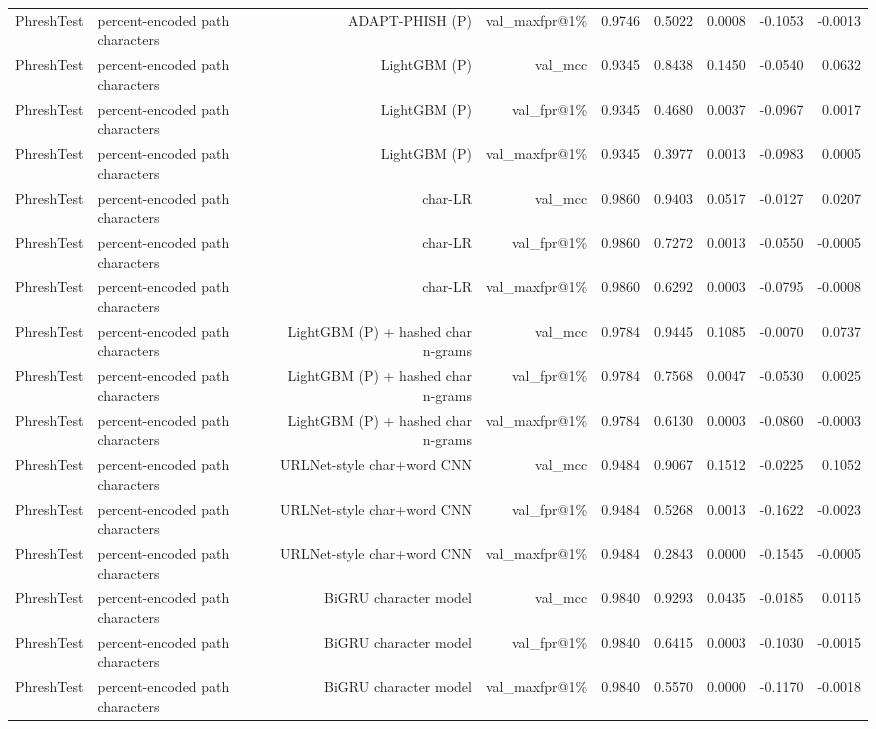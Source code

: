 \begin{table}[t]
\begin{tabular}{llrrrrrrr}
PhreshTest & percent-encoded path characters & ADAPT-PHISH (P) & val\_maxfpr@1\% & 0.9746 & 0.5022 & 0.0008 & -0.1053 & -0.0013 \\
PhreshTest & percent-encoded path characters & LightGBM (P) & val\_mcc & 0.9345 & 0.8438 & 0.1450 & -0.0540 & 0.0632 \\
PhreshTest & percent-encoded path characters & LightGBM (P) & val\_fpr@1\% & 0.9345 & 0.4680 & 0.0037 & -0.0967 & 0.0017 \\
PhreshTest & percent-encoded path characters & LightGBM (P) & val\_maxfpr@1\% & 0.9345 & 0.3977 & 0.0013 & -0.0983 & 0.0005 \\
PhreshTest & percent-encoded path characters & char-LR & val\_mcc & 0.9860 & 0.9403 & 0.0517 & -0.0127 & 0.0207 \\
PhreshTest & percent-encoded path characters & char-LR & val\_fpr@1\% & 0.9860 & 0.7272 & 0.0013 & -0.0550 & -0.0005 \\
PhreshTest & percent-encoded path characters & char-LR & val\_maxfpr@1\% & 0.9860 & 0.6292 & 0.0003 & -0.0795 & -0.0008 \\
PhreshTest & percent-encoded path characters & LightGBM (P) + hashed char n-grams & val\_mcc & 0.9784 & 0.9445 & 0.1085 & -0.0070 & 0.0737 \\
PhreshTest & percent-encoded path characters & LightGBM (P) + hashed char n-grams & val\_fpr@1\% & 0.9784 & 0.7568 & 0.0047 & -0.0530 & 0.0025 \\
PhreshTest & percent-encoded path characters & LightGBM (P) + hashed char n-grams & val\_maxfpr@1\% & 0.9784 & 0.6130 & 0.0003 & -0.0860 & -0.0003 \\
PhreshTest & percent-encoded path characters & URLNet-style char+word CNN & val\_mcc & 0.9484 & 0.9067 & 0.1512 & -0.0225 & 0.1052 \\
PhreshTest & percent-encoded path characters & URLNet-style char+word CNN & val\_fpr@1\% & 0.9484 & 0.5268 & 0.0013 & -0.1622 & -0.0023 \\
PhreshTest & percent-encoded path characters & URLNet-style char+word CNN & val\_maxfpr@1\% & 0.9484 & 0.2843 & 0.0000 & -0.1545 & -0.0005 \\
PhreshTest & percent-encoded path characters & BiGRU character model & val\_mcc & 0.9840 & 0.9293 & 0.0435 & -0.0185 & 0.0115 \\
PhreshTest & percent-encoded path characters & BiGRU character model & val\_fpr@1\% & 0.9840 & 0.6415 & 0.0003 & -0.1030 & -0.0015 \\
PhreshTest & percent-encoded path characters & BiGRU character model & val\_maxfpr@1\% & 0.9840 & 0.5570 & 0.0000 & -0.1170 & -0.0018 \\

\end{tabular}
\end{table}
